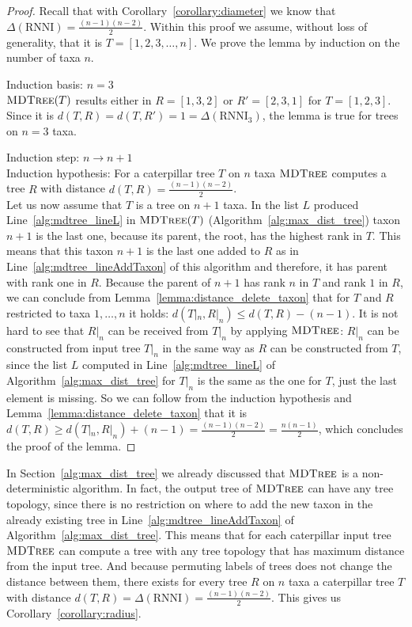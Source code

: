 \documentclass{amsart}
\newcommand{\rnni}{\mathrm{RNNI}}
\newcommand{\mdtree}{\textsc{MDTree}}
\begin{document}
\begin{proof}
Recall that with Corollary~\ref{corollary:diameter} we know that $\Delta(\rnni) = \frac{(n-1)(n-2)}{2}$.
Within this proof we assume, without loss of generality, that it is $T = [1,2,3,\ldots,n]$.
We prove the lemma by induction on the number of taxa $n$.

Induction basis: $n = 3$\\
$\mdtree(T)$ results either in $R =[1,3,2]$ or $R'= [2,3,1]$ for $T = [1,2,3]$.
Since it is $d(T,R) = d(T,R') = 1 = \Delta(\rnni_3)$, the lemma is true for trees on $n=3$ taxa.

Induction step: $n \to n+1$\\
Induction hypothesis: For a caterpillar tree $T$ on $n$ taxa $\mdtree$ computes a tree $R$ with distance $d(T,R) = \frac{(n-1)(n-2)}{2}$.\\
Let us now assume that $T$ is a tree on $n+1$ taxa.
In the list $L$ produced Line~\ref{alg:mdtree_lineL} in $\mdtree(T)$ (Algorithm~\ref{alg:max_dist_tree}) taxon $n+1$ is the last one, because its parent, the root, has the highest rank in $T$.
This means that this taxon $n+1$ is the last one added to $R$ as in Line~\ref{alg:mdtree_lineAddTaxon} of this algorithm and therefore, it has parent with rank one in $R$.
Because the parent of $n+1$ has rank $n$ in $T$ and rank $1$ in $R$, we can conclude from Lemma~\ref{lemma:distance_delete_taxon} that for $T$ and $R$ restricted to taxa $1,\ldots,n$ it holds: $d(T|_n,R|_n) \leq d(T,R) - (n-1)$.
It is not hard to see that $R|_n$ can be received from $T|_n$ by applying $\mdtree$:
$R|_n$ can be constructed from input tree $T|_n$ in the same way as $R$ can be constructed from $T$, since the list $L$ computed in Line~\ref{alg:mdtree_lineL} of Algorithm~\ref{alg:max_dist_tree} for $T|_n$ is the same as the one for $T$, just the last element is missing.
So we can follow from the induction hypothesis and Lemma~\ref{lemma:distance_delete_taxon} that it is $d(T,R) \geq d(T|_n,R|_n) + (n-1) = \frac{(n-1)(n-2)}{2} = \frac{n(n-1)}{2}$, which concludes the proof of the lemma.
\end{proof}

In Section~\ref{alg:max_dist_tree} we already discussed that $\mdtree$ is a non-deterministic algorithm.
In fact, the output tree of $\mdtree$ can have any tree topology, since there is no restriction on where to add the new taxon in the already existing tree in Line~\ref{alg:mdtree_lineAddTaxon} of Algorithm~\ref{alg:max_dist_tree}.
This means that for each caterpillar input tree $\mdtree$ can compute a tree with any tree topology that has maximum distance from the input tree.
And because permuting labels of trees does not change the distance between them, there exists for every tree $R$ on $n$ taxa a caterpillar tree $T$ with distance $d(T,R) = \Delta(\rnni) = \frac{(n-1)(n-2)}{2}$.
This gives us Corollary~\ref{corollary:radius}.
\end{document}
